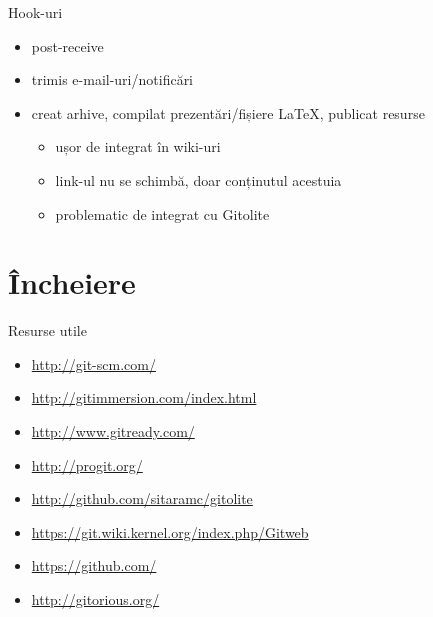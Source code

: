\documentclass{beamer}
\begin{document}
\begin{frame}{Hook-uri}
	\begin{itemize}
		\item post-receive
		\item trimis e-mail-uri/notificări
		\item creat arhive, compilat prezentări/fișiere LaTeX, publicat
		resurse
			\begin{itemize}
				\item ușor de integrat în wiki-uri
				\item link-ul nu se schimbă, doar conținutul acestuia
                \item problematic de integrat cu Gitolite
			\end{itemize}
	\end{itemize}
\end{frame}

\section{Încheiere}

\begin{frame}{Resurse utile}
	\begin{itemize}
		\item \url{http://git-scm.com/}
        \item \url{http://gitimmersion.com/index.html}
        \item \url{http://www.gitready.com/}
		\item \url{http://progit.org/}
		\item \url{http://github.com/sitaramc/gitolite}
		\item \url{https://git.wiki.kernel.org/index.php/Gitweb}
        \item \url{https://github.com/}
        \item \url{http://gitorious.org/}
	\end{itemize}
\end{frame}
\end{document}
